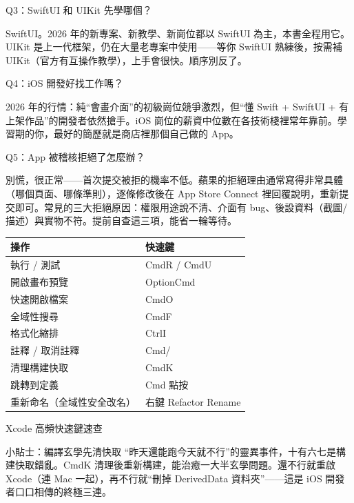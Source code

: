 Q3：SwiftUI 和 UIKit 先學哪個？

SwiftUI。2026 年的新專案、新教學、新崗位都以 SwiftUI 為主，本書全程用它。UIKit 是上一代框架，仍在大量老專案中使用——等你 SwiftUI 熟練後，按需補 UIKit（官方有互操作教學），上手會很快。順序別反了。

Q4：iOS 開發好找工作嗎？

2026 年的行情：純“會畫介面”的初級崗位競爭激烈，但“懂 Swift + SwiftUI + 有上架作品”的開發者依然搶手。iOS 崗位的薪資中位數在各技術棧裡常年靠前。學習期的你，最好的簡歷就是商店裡那個自己做的 App。

Q5：App 被稽核拒絕了怎麼辦？

別慌，很正常——首次提交被拒的機率不低。蘋果的拒絕理由通常寫得非常具體（哪個頁面、哪條準則），逐條修改後在 App Store Connect 裡回覆說明，重新提交即可。常見的三大拒絕原因：權限用途說不清、介面有 bug、後設資料（截圖/描述）與實物不符。提前自查這三項，能省一輪等待。


\begin{center}
\begin{tabularx}{\linewidth}{|X|X|}
\hline
\textbf{操作} & \textbf{快速鍵} \tabularnewline
\hline
執行 / 測試 & CmdR / CmdU \tabularnewline
開啟畫布預覽 & OptionCmd \tabularnewline
快速開啟檔案 & CmdO \tabularnewline
全域性搜尋 & CmdF \tabularnewline
格式化縮排 & CtrlI \tabularnewline
註釋 / 取消註釋 & Cmd/ \tabularnewline
清理構建快取 & CmdK \tabularnewline
跳轉到定義 & Cmd 點按 \tabularnewline
重新命名（全域性安全改名） & 右鍵 Refactor Rename \tabularnewline
\hline
\end{tabularx}
\end{center}

\begin{center}\small\color{gray}Xcode 高頻快速鍵速查\end{center}

\begin{tcbinfo}{小貼士：編譯玄學先清快取}
“昨天還能跑今天就不行”的靈異事件，十有六七是構建快取錯亂。CmdK 清理後重新構建，能治癒一大半玄學問題。還不行就重啟 Xcode（連 Mac 一起），再不行就“刪掉 DerivedData 資料夾”——這是 iOS 開發者口口相傳的終極三連。

\end{tcbinfo}




